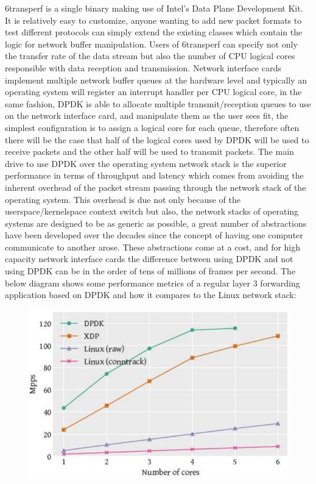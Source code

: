 \documentclass[a4paper,12p]{article}
\begin{document}
6transperf is a single binary making use of Intel’s Data Plane Development Kit. It is relatively easy to customize, anyone wanting to add new packet formats to test different protocols can simply extend the existing classes which contain the logic for network buffer manipulation. Users of 6transperf can specify not only the transfer rate of the data stream but also the number of CPU logical cores responsible with data reception and transmission. Network interface cards implement multiple network buffer queues at the hardware level and typically an operating system will register an interrupt handler per CPU logical core, in the same fashion, DPDK is able to allocate multiple transmit/reception queues to use on the network interface card, and manipulate them as the user sees fit, the simplest configuration is to assign a logical core for each queue, therefore often there will be the case that half of the logical cores used by DPDK will be used to receive packets and the other half will be used to transmit packets. The main drive to use DPDK over the operating system network stack is the superior performance in terms of throughput and latency which comes from avoiding the inherent overhead of the packet stream passing through the network stack of the operating system. This overhead is due not only because of the userspace/kernelspace context switch but also, the network stacks of operating systems are designed to be as generic as possible, a great number of abstractions have been developed over the decades since the concept of having one computer communicate to another arose. These abstractions come at a cost, and for high capacity network interface cards the difference between using DPDK and not using DPDK can be in the order of tens of millions of frames per second. The below diagram shows some performance metrics of a regular layer 3 forwarding application based on DPDK and how it compares to the Linux network stack:

\begin{figure}[h]
\centering
\includegraphics[width=\textwidth]{dpdk}
\end{figure}
\end{document}
